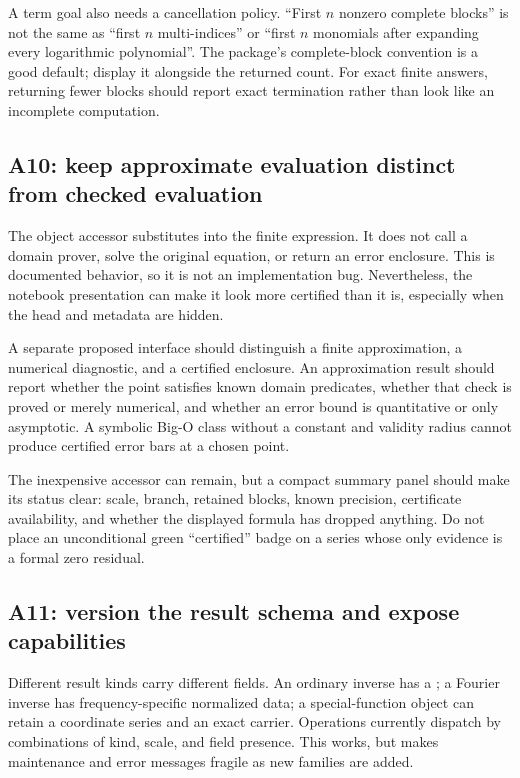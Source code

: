 \documentclass[11pt,a4paper]{article}
\newcommand{\code}[1]{\texttt{\detokenize{#1}}}
\begin{document}
A term goal also needs a cancellation policy. ``First $n$ nonzero complete
blocks'' is not the same as ``first $n$ multi-indices'' or ``first $n$
monomials after expanding every logarithmic polynomial''. The package's
complete-block convention is a good default; display it alongside the
returned count. For exact finite answers, returning fewer blocks should
report exact termination rather than look like an incomplete computation.

\subsection{A10: keep approximate evaluation distinct from checked evaluation}
The object accessor \code{s[value]} substitutes into the finite expression.
It does not call a domain prover, solve the original equation, or return an
error enclosure. This is documented behavior, so it is not an implementation
bug. Nevertheless, the notebook presentation can make it look more
certified than it is, especially when the head and metadata are hidden.
\cite{core}

A separate proposed \code{SeriesEvaluate} interface should distinguish a
finite approximation, a numerical diagnostic, and a certified enclosure.
An approximation result should report whether the point satisfies known
domain predicates, whether that check is proved or merely numerical, and
whether an error bound is quantitative or only asymptotic. A symbolic
Big-O class without a constant and validity radius cannot produce certified
error bars at a chosen point.

The inexpensive accessor can remain, but a compact summary panel should
make its status clear: scale, branch, retained blocks, known precision,
certificate availability, and whether the displayed formula has dropped
anything. Do not place an unconditional green ``certified'' badge on a
series whose only evidence is a formal zero residual.

\subsection{A11: version the result schema and expose capabilities}
Different result kinds carry different fields. An ordinary inverse has a
\code{Model}; a Fourier inverse has frequency-specific normalized data;
a special-function object can retain a coordinate series and an exact
carrier. Operations currently dispatch by combinations of kind, scale,
and field presence. This works, but makes maintenance and error messages
fragile as new families are added.
\cite{core,seriesops,fourier,special}
\end{document}
